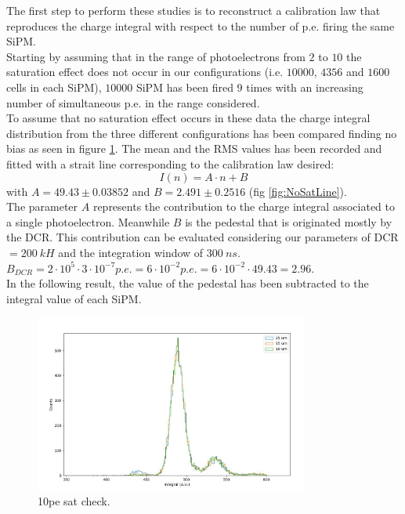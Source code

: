 The first step to perform these studies is to reconstruct a calibration law that reproduces the charge integral with respect to the number of p.e. firing the same SiPM.\\
Starting by assuming that in the range of photoelectrons from $2$ to $10$ the saturation effect does not occur in our configurations (i.e. $10000$, $4356$ and $1600$ cells in each SiPM), $10000$ SiPM has been fired $9$ times with an increasing number of simultaneous p.e. in the range considered.\\
To assume that no saturation effect occurs in these data the charge integral distribution from the three different configurations has been compared finding no bias as seen in figure \ref{fig:SatCheck}. The mean and the RMS values has been recorded and fitted with a strait line corresponding to the calibration law desired:
\begin{equation}
	I(n) = A \cdot n + B
\end{equation}
with $A = 49.43 \pm 0.03852$ and $B = 2.491 \pm 0.2516$ (fig \ref{fig:NoSatLine}).\\
The parameter $A$ represents the contribution to the charge integral associated to a single photoelectron. Meanwhile $B$ is the pedestal that is originated mostly by the DCR. This contribution can be evaluated considering our parameters of DCR $= 200\ kH$ and the integration window of $300\ ns$.
$B_{DCR} = 2 \cdot 10^5 \cdot 3 \cdot 10^{-7} p.e. = 6\cdot 10^{-2} p.e. = 6\cdot 10^{-2} \cdot 49.43 = 2.96$.\\
In the following result, the value of the pedestal has been subtracted to the integral value of each SiPM.\\

\begin{figure}
	\centering
	\includegraphics[width=0.8\textwidth]{IMG/10pe_sat_check}
	\caption{10pe sat check.}
	\label{fig:SatCheck}
\end{figure}

